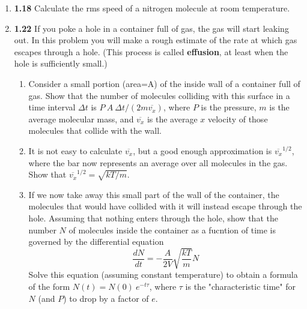 \documentclass[fleqn]{article}
\begin{document}
\begin{enumerate}
\begin{enumerate}
    \end{enumerate}
    
    \item \textbf{1.18} Calculate the rms speed of a nitrogen molecule at room temperature.

    
    \item \textbf{1.22} If you poke a hole in a container full of gas, the gas will start leaking out. In this problem you 
    will make a rough estimate of the rate at which gas escapes through a hole. (This process is called \textbf{effusion}, at least when 
    the hole is sufficiently small.)

      \begin{enumerate}
        \item Consider a small portion (area=A) of the inside wall of a container full of gas. Show that the number of molecules colliding
        with this surface in a time interval $\Delta t$ is $P ~ A ~ \Delta t/(2m \overline{v_x})$, where $P$ is the pressure, $m$ is the 
        average molecular mass, and $\overline{v_x}$ is the average $x$ velocity of those molecules that collide with the wall.


        \item It is not easy to calculate $\overline{v_x}$, but a good enough approximation is $\overline{v_x}^{1/2}$, where the bar 
        now represents an average over all molecules in the gas. Show that $\overline{v_x}^{1/2}=\sqrt{kT/m}.$

          
        \item If we now take away this small part of the wall of the container, the molecules that would have collided with it will 
        instead escape through the hole. Assuming that nothing enters through the hole, show that the number $N$ of molecules inside
        the container as a fucntion of time is governed by the differential equation
        $$
          \dfrac{dN}{dt}=-\dfrac{A}{2V} \sqrt{\dfrac{kT}{m}} N
        $$
        Solve this equation (assuming constant temperature) to obtain a formula of the form $N(t)=N(0) ~ e^{-t\tau}$, where $\tau$
        is the "characteristic time" for $N$ (and $P$) to drop by a factor of $e$.


\end{enumerate}
\end{enumerate}
\end{document}
